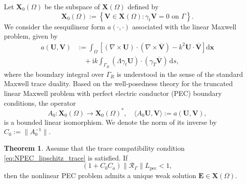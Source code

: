 \documentclass[12pt,reqno]{amsart}
\theoremstyle{definition}
\newtheorem{theo}{Theorem}[section]
\numberwithin{equation}{section}
\begin{document}
Let $\mathbf{X}_0(\Omega)$ be the subspace of $\mathbf{X}(\Omega)$ defined by
\[
\mathbf{X}_0(\Omega) := \left\{ \mathbf{V} \in \mathbf{X}(\Omega) : \gamma_t \mathbf{V} = 0 \text{ on } \Gamma \right\}.
\]
We consider the sesquilinear form $a(\cdot, \cdot)$ associated with the linear Maxwell problem, given by
\[
\begin{aligned}
a(\mathbf{U}, \mathbf{V}) &:= \int_{\Omega} \left[ (\nabla \times \mathbf{U}) \cdot (\nabla \times \overline{\mathbf{V}}) - k^2 \mathbf{U} \cdot \overline{\mathbf{V}} \right] \mathrm{d}\boldsymbol{x} \\
&\quad + \mathrm{i}k \int_{\Gamma_R} (\Lambda \gamma_t \mathbf{U}) \cdot (\gamma_T \overline{\mathbf{V}}) \,\mathrm{d}s,
\end{aligned}
\]
where the boundary integral over $\Gamma_R$ is understood in the sense of the standard Maxwell trace duality. Based on the well-posedness theory for the truncated linear Maxwell problem with perfect electric conductor (PEC) boundary conditions, the operator
\[
A_0 : \mathbf{X}_0(\Omega) \to \mathbf{X}_0(\Omega)^*, \quad \langle A_0 \mathbf{U}, \mathbf{V} \rangle := a(\mathbf{U}, \mathbf{V}),
\]
is a bounded linear isomorphism. We denote the norm of its inverse by $C_0 := \|A_0^{-1}\|$.


\begin{theo}
\label{thm:nonlinear_pec}
Assume that the trace compatibility condition \eqref{eq:NPEC_lipschitz_trace} is satisfied. If
\[
(1+C_0 C_a) \|\mathcal{R}_\Gamma\| L_{\mathrm{pec}} < 1,
\]
then the nonlinear PEC problem admits a unique weak solution $\mathbf{E} \in \mathbf{X}(\Omega)$.
\end{theo}
\end{document}
